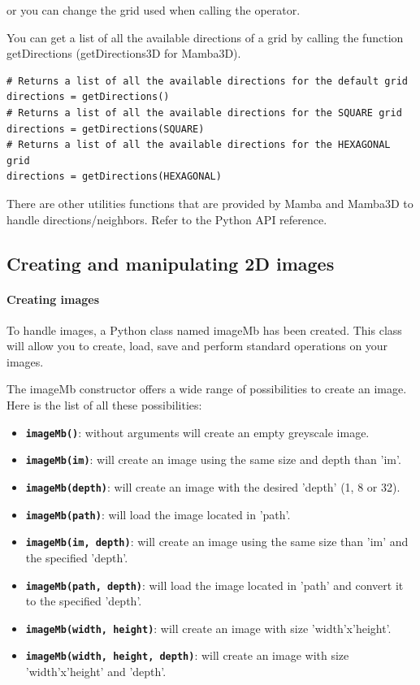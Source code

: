 \documentclass[a4paper,10pt,oneside]{article}
\begin{document}
or you can change the grid used when calling the operator.

You can get a list of all the available directions of a grid
by calling the function getDirections (getDirections3D for Mamba3D).

\lstset{language=Python}
\begin{lstlisting}
# Returns a list of all the available directions for the default grid
directions = getDirections()
# Returns a list of all the available directions for the SQUARE grid
directions = getDirections(SQUARE)
# Returns a list of all the available directions for the HEXAGONAL grid
directions = getDirections(HEXAGONAL)
\end{lstlisting}

There are other utilities functions that are provided by Mamba and Mamba3D to
handle  directions/neighbors. Refer to the Python API reference.

\subsection{Creating and manipulating 2D images}
\label{cha:create_im}

\paragraph{Creating images}

To handle images, a Python class named imageMb has been created. This class will allow
you to create, load, save and perform standard operations on your images.

The imageMb constructor offers a wide range of possibilities to create an image. 
Here is the list of all these possibilities:

\begin{itemize}
\item \texttt{\textbf{imageMb()}}: without arguments will create an empty 
greyscale image.
\item \texttt{\textbf{imageMb(im)}}: will create an image using the same size 
and depth than 'im'.
\item \texttt{\textbf{imageMb(depth)}}: will create an image with the desired
'depth' (1, 8 or 32).
\item \texttt{\textbf{imageMb(path)}}: will load the image located in 'path'.
\item \texttt{\textbf{imageMb(im, depth)}}: will create an image using the same 
size than 'im' and the specified 'depth'.
\item \texttt{\textbf{imageMb(path, depth)}}: will load the image located in 
'path' and convert it to the specified 'depth'.
\item \texttt{\textbf{imageMb(width, height)}}: will create an image with size 
'width'x'height'.
\item \texttt{\textbf{imageMb(width, height, depth)}}: will create an image with
size 'width'x'height' and 'depth'.
\end{itemize}
\end{document}
